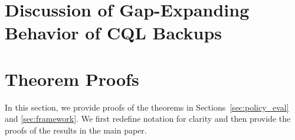 
\section{Discussion of Gap-Expanding Behavior of CQL Backups}
\label{app:gap_amplify}
\vspace{-0.25cm}


\vspace{-0.3cm}
\section{Theorem Proofs}
\label{app:missing_proofs}
\vspace{-0.3cm}

In this section, we provide proofs of the theorems in Sections~\ref{sec:policy_eval} and \ref{sec:framework}. We first redefine notation for clarity and then provide the proofs of the results in the main paper.

